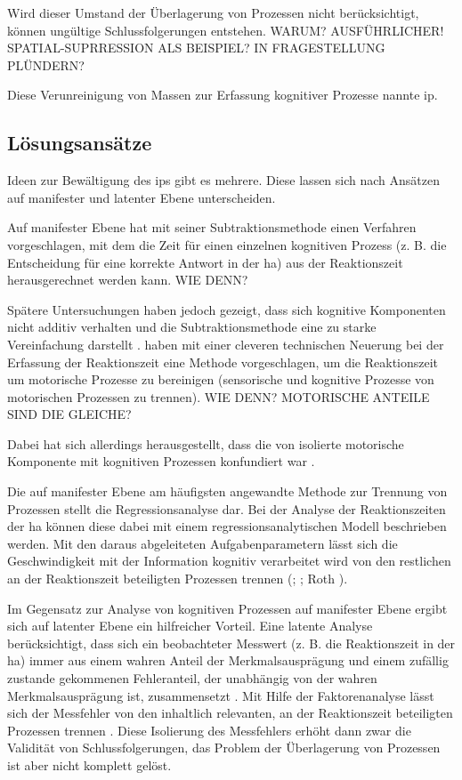\documentclass[11pt, twoside, a4paper]{book}		%
\begin{document}
Wird dieser Umstand der Überlagerung von Prozessen nicht berücksichtigt, können ungültige Schlussfolgerungen entstehen. WARUM? AUSFÜHRLICHER! SPATIAL-SUPRRESSION ALS BEISPIEL? IN FRAGESTELLUNG PLÜNDERN?

Diese Verunreinigung von Massen zur Erfassung kognitiver Prozesse nannte \citet{Schweizer2007} \gls{ip}.


\subsection{Lösungsansätze}

Ideen zur Bewältigung des \gls{ip}s gibt es mehrere. Diese lassen sich nach Ansätzen auf manifester und latenter Ebene unterscheiden. 

Auf manifester Ebene hat \citet{Donders1969} mit seiner Subtraktionsmethode einen Verfahren vorgeschlagen, mit dem die Zeit für einen einzelnen kognitiven Prozess (z. B. die Entscheidung für eine korrekte Antwort in der \gls{ha}) aus der Reaktionszeit herausgerechnet werden kann. WIE DENN?

Spätere Untersuchungen haben jedoch gezeigt, dass sich kognitive Komponenten nicht additiv verhalten und die Subtraktionsmethode eine zu starke Vereinfachung darstellt \citep[z. B.][]{Friston1996, Ilan1994}.
\citet{Jensen1979} haben mit einer cleveren technischen Neuerung bei der Erfassung der Reaktionszeit eine Methode vorgeschlagen, um die Reaktionszeit um motorische Prozesse zu bereinigen (sensorische und kognitive Prozesse von motorischen Prozessen zu trennen). WIE DENN? MOTORISCHE ANTEILE SIND DIE GLEICHE? 


Dabei hat sich allerdings herausgestellt, dass die von \citet{Jensen1979} isolierte motorische Komponente mit kognitiven Prozessen konfundiert war \citep{Jensen1979, Smith1987b}.


Die auf manifester Ebene am häufigsten angewandte Methode zur Trennung von Prozessen stellt die Regressionsanalyse dar. Bei der Analyse der Reaktionszeiten der \gls{ha} können diese dabei mit einem regressionsanalytischen Modell beschrieben werden. Mit den daraus abgeleiteten Aufgabenparametern lässt sich die Geschwindigkeit mit der Information kognitiv verarbeitet wird von den restlichen an der Reaktionszeit beteiligten Prozessen trennen (\citealp{Hick1952}; \citealp{Jensen1998a}; Roth \citealp[1964; zitiert nach][S. 105]{Jensen1987a}).

Im Gegensatz zur Analyse von kognitiven Prozessen auf manifester Ebene ergibt sich auf latenter Ebene ein hilfreicher Vorteil. Eine latente Analyse berücksichtigt, dass sich ein beobachteter Messwert (z. B. die Reaktionszeit in der \gls{ha}) immer aus einem wahren Anteil der Merkmalsausprägung und einem  zufällig zustande gekommenen Fehleranteil, der unabhängig von der wahren Merkmalsausprägung ist, zusammensetzt \citep{Moosbrugger2007}. 
Mit Hilfe der Faktorenanalyse lässt sich der Messfehler von den inhaltlich relevanten, an der Reaktionszeit beteiligten Prozessen trennen \citep[S. 9]{Kline2011}. Diese Isolierung des Messfehlers erhöht dann zwar die Validität von Schlussfolgerungen, das Problem der Überlagerung von Prozessen ist aber nicht komplett gelöst. 
\end{document}

